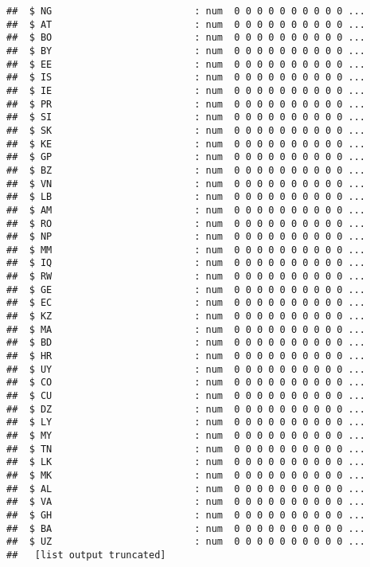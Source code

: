 \documentclass[
]{article}
\begin{document}
\begin{verbatim}
##  $ NG                         : num  0 0 0 0 0 0 0 0 0 0 ...
##  $ AT                         : num  0 0 0 0 0 0 0 0 0 0 ...
##  $ BO                         : num  0 0 0 0 0 0 0 0 0 0 ...
##  $ BY                         : num  0 0 0 0 0 0 0 0 0 0 ...
##  $ EE                         : num  0 0 0 0 0 0 0 0 0 0 ...
##  $ IS                         : num  0 0 0 0 0 0 0 0 0 0 ...
##  $ IE                         : num  0 0 0 0 0 0 0 0 0 0 ...
##  $ PR                         : num  0 0 0 0 0 0 0 0 0 0 ...
##  $ SI                         : num  0 0 0 0 0 0 0 0 0 0 ...
##  $ SK                         : num  0 0 0 0 0 0 0 0 0 0 ...
##  $ KE                         : num  0 0 0 0 0 0 0 0 0 0 ...
##  $ GP                         : num  0 0 0 0 0 0 0 0 0 0 ...
##  $ BZ                         : num  0 0 0 0 0 0 0 0 0 0 ...
##  $ VN                         : num  0 0 0 0 0 0 0 0 0 0 ...
##  $ LB                         : num  0 0 0 0 0 0 0 0 0 0 ...
##  $ AM                         : num  0 0 0 0 0 0 0 0 0 0 ...
##  $ RO                         : num  0 0 0 0 0 0 0 0 0 0 ...
##  $ NP                         : num  0 0 0 0 0 0 0 0 0 0 ...
##  $ MM                         : num  0 0 0 0 0 0 0 0 0 0 ...
##  $ IQ                         : num  0 0 0 0 0 0 0 0 0 0 ...
##  $ RW                         : num  0 0 0 0 0 0 0 0 0 0 ...
##  $ GE                         : num  0 0 0 0 0 0 0 0 0 0 ...
##  $ EC                         : num  0 0 0 0 0 0 0 0 0 0 ...
##  $ KZ                         : num  0 0 0 0 0 0 0 0 0 0 ...
##  $ MA                         : num  0 0 0 0 0 0 0 0 0 0 ...
##  $ BD                         : num  0 0 0 0 0 0 0 0 0 0 ...
##  $ HR                         : num  0 0 0 0 0 0 0 0 0 0 ...
##  $ UY                         : num  0 0 0 0 0 0 0 0 0 0 ...
##  $ CO                         : num  0 0 0 0 0 0 0 0 0 0 ...
##  $ CU                         : num  0 0 0 0 0 0 0 0 0 0 ...
##  $ DZ                         : num  0 0 0 0 0 0 0 0 0 0 ...
##  $ LY                         : num  0 0 0 0 0 0 0 0 0 0 ...
##  $ MY                         : num  0 0 0 0 0 0 0 0 0 0 ...
##  $ TN                         : num  0 0 0 0 0 0 0 0 0 0 ...
##  $ LK                         : num  0 0 0 0 0 0 0 0 0 0 ...
##  $ MK                         : num  0 0 0 0 0 0 0 0 0 0 ...
##  $ AL                         : num  0 0 0 0 0 0 0 0 0 0 ...
##  $ VA                         : num  0 0 0 0 0 0 0 0 0 0 ...
##  $ GH                         : num  0 0 0 0 0 0 0 0 0 0 ...
##  $ BA                         : num  0 0 0 0 0 0 0 0 0 0 ...
##  $ UZ                         : num  0 0 0 0 0 0 0 0 0 0 ...
##   [list output truncated]
\end{verbatim}
\end{document}
